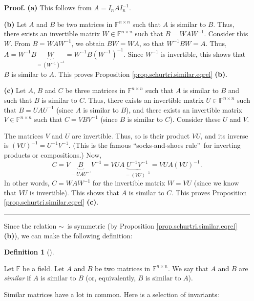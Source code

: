 \documentclass[numbers=enddot,12pt,final,onecolumn,notitlepage]{scrartcl}%
\numberwithin{exer}{subsection}
\theoremstyle{definition}
\newtheorem{defi}[theo]{Definition}
\newenvironment{definition}[1][]
{\begin{defi}[#1]\begin{leftbar}}
{\end{leftbar}\end{defi}}
\newenvironment{proof}[1][Proof]{\noindent\textbf{#1.} }{\ \rule{0.5em}{0.5em}}
\begin{document}
\begin{proof}
\textbf{(a)} This follows from $A=I_{n}AI_{n}^{-1}$. \medskip

\textbf{(b)} Let $A$ and $B$ be two matrices in $\mathbb{F}^{n\times n}$ such
that $A$ is similar to $B$. Thus, there exists an invertible matrix
$W\in\mathbb{F}^{n\times n}$ such that $B=WAW^{-1}$. Consider this $W$. From
$B=WAW^{-1}$, we obtain $BW=WA$, so that $W^{-1}BW=A$. Thus, $A=W^{-1}%
B\underbrace{W}_{=\left(  W^{-1}\right)  ^{-1}}=W^{-1}B\left(  W^{-1}\right)
^{-1}$. Since $W^{-1}$ is invertible, this shows that $B$ is similar to $A$.
This proves Proposition \ref{prop.schurtri.similar.eqrel} \textbf{(b)}.
\medskip

\textbf{(c)} Let $A$, $B$ and $C$ be three matrices in $\mathbb{F}^{n\times
n}$ such that $A$ is similar to $B$ and such that $B$ is similar to $C$. Thus,
there exists an invertible matrix $U\in\mathbb{F}^{n\times n}$ such that
$B=UAU^{-1}$ (since $A$ is similar to $B$), and there exists an invertible
matrix $V\in\mathbb{F}^{n\times n}$ such that $C=VBV^{-1}$ (since $B$ is
similar to $C$). Consider these $U$ and $V$.

The matrices $V$ and $U$ are invertible. Thus, so is their product $VU$, and
its inverse is $\left(  VU\right)  ^{-1}=U^{-1}V^{-1}$. (This is the famous
\textquotedblleft socks-and-shoes rule\textquotedblright\ for inverting
products or compositions.) Now,%
\[
C=V\underbrace{B}_{=UAU^{-1}}V^{-1}=VUA\underbrace{U^{-1}V^{-1}}_{=\left(
VU\right)  ^{-1}}=VUA\left(  VU\right)  ^{-1}.
\]
In other words, $C=WAW^{-1}$ for the invertible matrix $W=VU$ (since we know
that $VU$ is invertible). This shows that $A$ is similar to $C$. This proves
Proposition \ref{prop.schurtri.similar.eqrel} \textbf{(c)}.
\end{proof}

Since the relation $\sim$\ is symmetric (by Proposition
\ref{prop.schurtri.similar.eqrel} \textbf{(b)}), we can make the following definition:

\begin{definition}
Let $\mathbb{F}$ be a field. Let $A$ and $B$ be two matrices in $\mathbb{F}%
^{n\times n}$. We say that $A$ and $B$ are \emph{similar} if $A$ is similar to
$B$ (or, equivalently, $B$ is similar to $A$).
\end{definition}

Similar matrices have a lot in common. Here is a selection of invariants:
\end{document}
